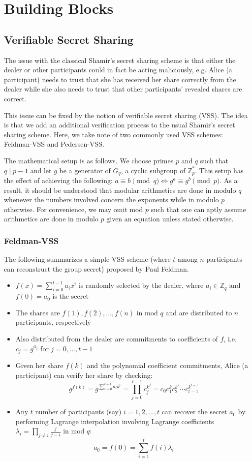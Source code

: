 \documentclass[letterpaper,twocolumn,10pt]{article}
\theoremstyle{definition}
\theoremstyle{remark}
\begin{document}
\section{Building Blocks}
\subsection{Verifiable Secret Sharing}
The issue with the classical Shamir's secret sharing scheme is that either the dealer or other participants could in fact be acting maliciously, e.g. Alice (a participant) needs to trust that she has received her share correctly from the dealer while she also needs to trust that other participants' revealed shares are correct.

This issue can be fixed by the notion of verifiable secret sharing (VSS). The idea is that we add an additional verification process to the usual Shamir's secret sharing scheme. Here, we take note of two commonly used VSS schemes: Feldman-VSS and Pedersen-VSS.

The mathematical setup is as follows. We choose primes $p$ and $q$ such that $q \mid p - 1$ and let $g$ be a generator of $G_q$, a cyclic subgroup of $\mathbb{Z}^*_p$. This setup has the effect of achieving the following: $a \equiv b \pmod q \iff g^a \equiv g^b \pmod p$. As a result, it should be understood that modular arithmetics are done in modulo $q$ whenever the numbers involved concern the exponents while in modulo $p$ otherwise. For convenience, we may omit mod $p$ such that one can aptly assume arithmetics are done in modulo $p$ given an equation unless stated otherwise.

\subsubsection{Feldman-VSS}
The following summarizes a simple VSS scheme (where $t$ among $n$ participants can reconstruct the group secret) proposed by Paul Feldman.

\begin{itemize}
\item $f(x) = \sum_{i = 0}^{t - 1} a_i x^i$ is randomly selected by the dealer, where $a_i \in \mathbb{Z}_q$ and $f(0) = a_0$ is the secret
\item The shares are $f(1), f(2), ..., f(n)$ in mod $q$ and are distributed to $n$ participants, respectively
\item Also distributed from the dealer are commitments to coefficients of $f$, i.e. $c_j = g^{a_j}$ for $j = 0, ..., t - 1$
\item Given her share $f(k)$ and the polynomial coefficient commitments, Alice (a participant) can verify her share by checking:
$$g^{f(k)} = g^{\sum_{i = 0}^{t - 1} a_i k^i} = \prod_{j = 0}^{t - 1} c_j^{k^j} = c_0 c_1^k c_2^{k^2} \cdots c_{t - 1}^{k^{t - 1}}$$
\item Any $t$ number of participants (say) $i = 1, 2, ..., t$ can recover the secret $a_0$ by performing Lagrange interpolation involving Lagrange coefficients $\lambda_i = \prod_{j \neq i} \frac{j}{j - i}$ in mod $q$:
$$a_0 = f(0) = \sum_{i = 1}^{t} f(i) \lambda_i$$
\end{itemize}
\end{document}
